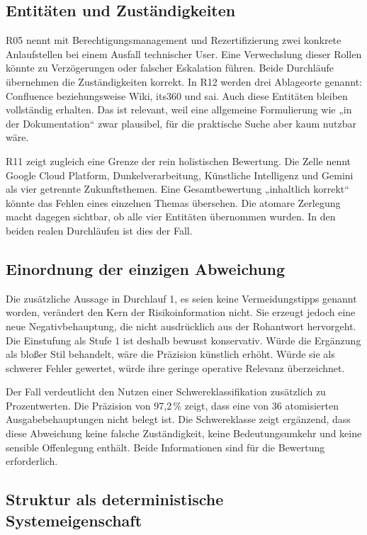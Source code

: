 \documentclass[
  10pt,
  ngerman,
  a4paper,
  toc=graduated,
  numbers=noenddot,
  headings=standardclasses,
  nonumberlist
]{scrartcl}
\newcommand{\pct}[1]{#1\,\%}
\begin{document}
\subsection{Entitäten und Zuständigkeiten}

R05 nennt mit Berechtigungsmanagement und Rezertifizierung zwei konkrete Anlaufstellen bei einem Ausfall technischer User. Eine Verwechslung dieser Rollen könnte zu Verzögerungen oder falscher Eskalation führen. Beide Durchläufe übernehmen die Zuständigkeiten korrekt. In R12 werden drei Ablageorte genannt: Confluence beziehungsweise Wiki, its360 und sai. Auch diese Entitäten bleiben vollständig erhalten. Das ist relevant, weil eine allgemeine Formulierung wie „in der Dokumentation“ zwar plausibel, für die praktische Suche aber kaum nutzbar wäre.

R11 zeigt zugleich eine Grenze der rein holistischen Bewertung. Die Zelle nennt Google Cloud Platform, Dunkelverarbeitung, Künstliche Intelligenz und Gemini als vier getrennte Zukunftsthemen. Eine Gesamtbewertung „inhaltlich korrekt“ könnte das Fehlen eines einzelnen Themas übersehen. Die atomare Zerlegung macht dagegen sichtbar, ob alle vier Entitäten übernommen wurden. In den beiden realen Durchläufen ist dies der Fall.

\subsection{Einordnung der einzigen Abweichung}

Die zusätzliche Aussage in Durchlauf 1, es seien keine Vermeidungstipps genannt worden, verändert den Kern der Risikoinformation nicht. Sie erzeugt jedoch eine neue Negativbehauptung, die nicht ausdrücklich aus der Rohantwort hervorgeht. Die Einstufung als Stufe 1 ist deshalb bewusst konservativ. Würde die Ergänzung als bloßer Stil behandelt, wäre die Präzision künstlich erhöht. Würde sie als schwerer Fehler gewertet, würde ihre geringe operative Relevanz überzeichnet.

Der Fall verdeutlicht den Nutzen einer Schwereklassifikation zusätzlich zu Prozentwerten. Die Präzision von \pct{97{,}2} zeigt, dass eine von 36 atomisierten Ausgabebehauptungen nicht belegt ist. Die Schwereklasse zeigt ergänzend, dass diese Abweichung keine falsche Zuständigkeit, keine Bedeutungsumkehr und keine sensible Offenlegung enthält. Beide Informationen sind für die Bewertung erforderlich.

\subsection{Struktur als deterministische Systemeigenschaft}
\end{document}
